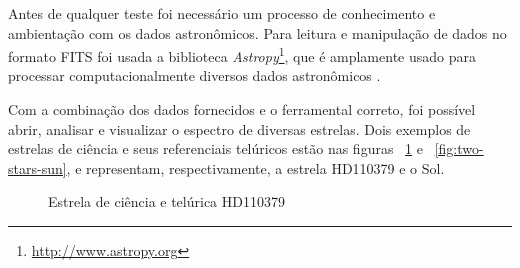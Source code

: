 Antes de qualquer teste foi necessário um processo de conhecimento e ambientação com os dados astronômicos. Para leitura e manipulação de dados no formato FITS foi usada a biblioteca \textit{Astropy}\footnote{\url{http://www.astropy.org}}, que é amplamente usado para processar computacionalmente diversos dados astronômicos \citep{astropy:2018}. 

Com a combinação dos dados fornecidos e o ferramental correto, foi possível abrir, analisar e visualizar o espectro de diversas estrelas. Dois exemplos de estrelas de ciência e seus referenciais telúricos estão nas figuras ~\ref{fig:two-stars-hd110379} e ~\ref{fig:two-stars-sun}, e representam, respectivamente, a estrela HD110379 e o Sol.

\begin{figure}[htb]
  \centering
  \hfill
  \caption{Estrela de ciência e telúrica HD110379}
  \label{fig:two-stars-hd110379}
\end{figure}


